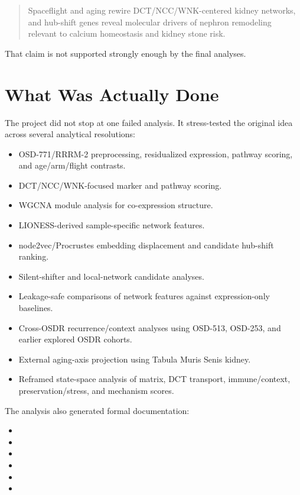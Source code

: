 \documentclass[11pt]{article}
\newcommand{\RRRM}{RRRM-2}
\newcommand{\OSD}{OSDR}
\begin{document}
\begin{quote}
Spaceflight and aging rewire DCT/NCC/WNK-centered kidney networks, and hub-shift genes reveal molecular drivers of nephron remodeling relevant to calcium homeostasis and kidney stone risk.
\end{quote}

That claim is not supported strongly enough by the final analyses.

\section*{What Was Actually Done}

The project did not stop at one failed analysis. It stress-tested the original idea across several analytical resolutions:

\begin{itemize}
  \item OSD-771/\RRRM{} preprocessing, residualized expression, pathway scoring, and age/arm/flight contrasts.
  \item DCT/NCC/WNK-focused marker and pathway scoring.
  \item WGCNA module analysis for co-expression structure.
  \item LIONESS-derived sample-specific network features.
  \item node2vec/Procrustes embedding displacement and candidate hub-shift ranking.
  \item Silent-shifter and local-network candidate analyses.
  \item Leakage-safe comparisons of network features against expression-only baselines.
  \item Cross-\OSD{} recurrence/context analyses using OSD-513, OSD-253, and earlier explored OSDR cohorts.
  \item External aging-axis projection using Tabula Muris Senis kidney.
  \item Reframed state-space analysis of matrix, DCT transport, immune/context, preservation/stress, and mechanism scores.
\end{itemize}

The analysis also generated formal documentation:

\begin{itemize}
  \item {}
  \item {}
  \item {}
  \item {}
  \item {}
  \item {}
\end{itemize}
\end{document}
